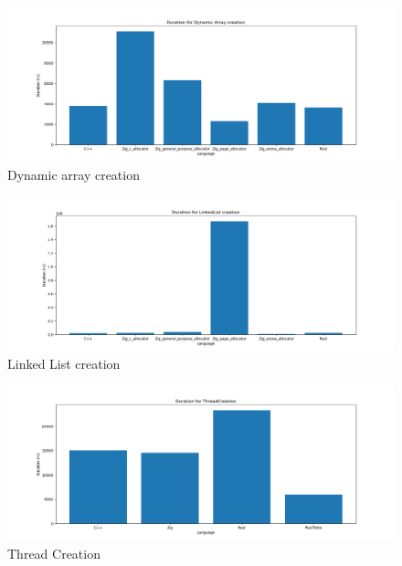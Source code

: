\documentclass{article}
\begin{document}
\begin{figure}[htbp]
    \centering
    \begin{minipage}{0.75\textwidth}
        \centering
        \includegraphics[width=\linewidth]{mem1.png}
        \caption{Dynamic array creation}
        \label{fig:def}
    \end{minipage}
\end{figure}

\begin{figure}[htbp]
    \centering
    \begin{minipage}{0.75\textwidth}
        \centering
        \includegraphics[width=\linewidth]{mem2.png}
        \caption{Linked List creation}
        \label{fig:ghi}
    \end{minipage}
\end{figure}

\begin{figure}[htbp]
    \centering
    \begin{minipage}{0.75\textwidth}
        \centering
        \includegraphics[width=\linewidth]{th.png}
        \caption{Thread Creation}
        \label{fig:abc}
    \end{minipage}
\end{figure}
\end{document}
